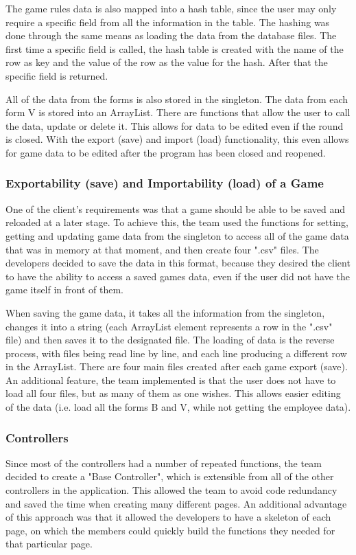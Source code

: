 \documentclass{l3proj}
\begin{document}
The game rules data is also mapped into a hash table, since the user may only require a specific field from all the information in the table. The hashing was done through the same means as loading the data from the database files. The first time a specific field is called, the hash table is created with the name of the row as key and the value of the row as the value for the hash. After that the specific field is returned.

All of the data from the forms is also stored in the singleton. The data from each form V is stored into an ArrayList. There are functions that allow the user to call the data, update or delete it. This allows for data to be edited even if the round is closed. With the export (save) and import (load) functionality, this even allows for game data to be edited after the program has been closed and reopened.

\subsubsection{Exportability (save) and Importability (load) of a Game}
One of the client's requirements was that a game should be able to be saved and reloaded at a later stage. To achieve this, the team used the functions for setting, getting and updating game data from the singleton to access all of the game data that was in memory at that moment, and then create four ".csv" files. The developers decided to save the data in this format, because they desired the client to have the ability to access a saved games data, even if the user did not have the game itself in front of them.

When saving the game data, it takes all the information from the singleton, changes it into a string (each ArrayList element represents a row in the ".csv" file) and then saves it to the designated file. The loading of data is the reverse process, with files being read line by line, and each line producing a different row in the ArrayList. There are four main files created after each game export (save). An additional feature, the team implemented is that the user does not have to load all four files, but as many of them as one wishes. This allows easier editing of the data (i.e. load all the forms B and V, while not getting the employee data).

\subsubsection{Controllers}
Since most of the controllers had a number of repeated functions, the team decided to create a "Base Controller", which is extensible from all of the other controllers in the application. This allowed the team to avoid code redundancy and saved the time when creating many different pages. An additional advantage of this approach was that it allowed the developers to have a skeleton of each page, on which the members could quickly build the functions they needed for that particular page.
\end{document}
